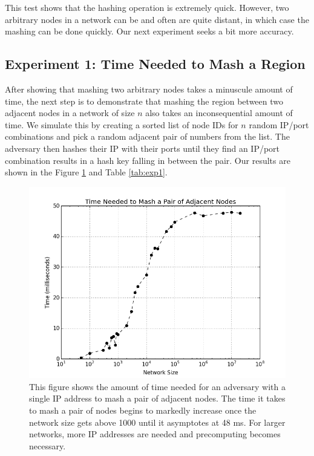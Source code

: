 \documentclass[11pt,conference]{IEEEtran}
\begin{document}
This test shows that the hashing operation is extremely quick.
However, two arbitrary nodes in a network can be and often are quite distant, in which case the mashing can be done quickly.
Our next experiment seeks a bit more accuracy.


\subsection{Experiment 1:  Time Needed to Mash a Region}
\label{sec:exp1}
After showing that mashing two arbitrary nodes takes a minuscule amount of time, the next step is to demonstrate that mashing the region between two adjacent nodes in a network of size $n$ also takes an inconsequential amount of time.
We simulate this by creating a sorted list of node IDs for $n$ random IP/port combinations and pick a random adjacent pair of numbers from the list.
The adversary then hashes their IP with their ports until they find an IP/port combination results in a hash key falling in between the pair.
Our results are shown in the Figure \ref{fig:exp1} and Table \ref{tab:exp1}.

\begin{figure}
\centering
\includegraphics[width=\linewidth]{size_time}
\caption{This figure shows the amount of time needed for an adversary with a single IP address to mash a pair of adjacent nodes.  The time it takes to mash a pair of nodes begins to markedly increase once the network size gets above 1000 until it asymptotes at 48 ms.  For larger networks, more IP addresses are needed and precomputing becomes necessary.}
\label{fig:exp1}
\end{figure}
\end{document}
